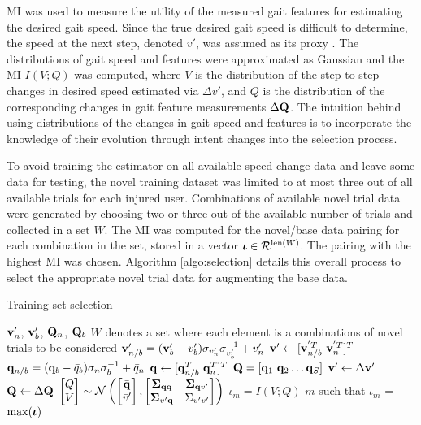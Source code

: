 MI was used to measure the utility of the measured gait features for estimating the desired gait speed. Since the true desired gait speed is difficult to determine, the speed at the next step, denoted $ v' $, was assumed as its proxy \cite{karulkar2021using}. The distributions of gait speed and features were approximated as Gaussian and the MI $ I(V ; Q) $ was computed, where $ V $ is the distribution of the step-to-step changes in desired speed estimated via $ \Delta v' $, and $ Q $ is the distribution of the corresponding changes in gait feature measurements $ \Delta \mathbf{Q} $. The intuition behind using distributions of the changes in gait speed and features is to incorporate the knowledge of their evolution through intent changes into the selection process. 

To avoid training the estimator on all available speed change data and leave some data for testing, the novel training dataset was limited to at most three out of all available trials for each injured user. Combinations of available novel trial data were generated by choosing two or three out of the available number of trials and collected in a set $ W $. The MI was computed for the novel/base data pairing for each combination in the set, stored in a vector $ \boldsymbol{\iota} \in \mathcal{R}^{{\rm len}(W)}$. The pairing with the highest MI was chosen. Algorithm \ref{algo:selection} details this overall process to select the appropriate novel trial data for augmenting the base data.

\begin{algorithm}
	\caption{Training set selection}\label{algo:selection}
	\begin{algorithmic}[1]
		\Require $ \mathbf{v}'_n$, $\mathbf{v}'_b $, $ \mathbf{Q}_n $, $\mathbf{Q}_b$
		 $ W $ denotes a set where each element is a combinations of novel trials to be considered
		\State $ \mathbf{v}'_{n/b} = (\mathbf{v}'_b - \bar{v}'_b)\sigma_{v'_n} \sigma_{v'_b}^{-1} + \bar{v}'_n $ 
		\State $ \v' \leftarrow [\v_{n/b}^{'T}\ \v_{n}^{'T}]^T $
		\State $ \mathbf{q}_{n/b} = (\mathbf{q}_b - \bar{q}_b)\sigma_n \sigma_b^{-1} + \bar{q}_n $ 
		\State $ \mathbf{q} \leftarrow [\mathbf{q}_{n/b}^T\ \mathbf{q}_{n}^T]^T $
		\EndFor
		\State $ \mathbf{Q} = [\mathbf{q}_1 \ \mathbf{q}_2 \dots \mathbf{q}_S] $
		\State $ \mathbf{v}' \leftarrow \Delta \mathbf{v}' $
		\State $ \mathbf{Q} \leftarrow \Delta \mathbf{Q} $
		\vskip 5pt
		\State $ \begin{bmatrix}
			Q \\
			V
		\end{bmatrix} \sim \mathcal{N} \left( \begin{bmatrix}
			\bar{\mathbf{q}} \\
			\bar{v}'
		\end{bmatrix},\begin{bmatrix}
			\boldsymbol{\Sigma}_{\mathbf{q} \mathbf{q}} & \boldsymbol{\Sigma}_{\mathbf{q} v'} \\
			\boldsymbol{\Sigma}_{v' \mathbf{q}} & \Sigma_{v'v'}
		\end{bmatrix}\right) $
		\vskip 2pt
		\State $ \iota_m = I(V;Q) $
		\EndFor
		\State \Return $m$ such that $\iota_m$ = $ \max(\boldsymbol{\iota}) $ 
	\end{algorithmic}
\end{algorithm}%

